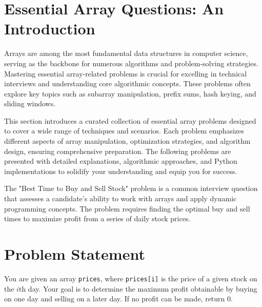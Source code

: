 \section{Essential Array Questions: An Introduction}
\label{sec:EssentialArrayQuestions}

Arrays are among the most fundamental data structures in computer science, serving as the backbone for numerous algorithms and problem-solving strategies. Mastering essential array-related problems is crucial for excelling in technical interviews and understanding core algorithmic concepts. These problems often explore key topics such as subarray manipulation, prefix sums, hash keying, and sliding windows. 

This section introduces a curated collection of essential array problems designed to cover a wide range of techniques and scenarios. Each problem emphasizes different aspects of array manipulation, optimization strategies, and algorithm design, ensuring comprehensive preparation. The following problems are presented with detailed explanations, algorithmic approaches, and Python implementations to solidify your understanding and equip you for success.

\label{problem:Best_Time_to_Buy_and_Sell_Stock}

The "Best Time to Buy and Sell Stock" problem is a common interview question that assesses a candidate's ability to work with arrays and apply dynamic programming concepts. The problem requires finding the optimal buy and sell times to maximize profit from a series of daily stock prices.

\section*{Problem Statement}
You are given an array \texttt{prices}, where \texttt{prices[i]} is the price of a given stock on the \(i\)th day. Your goal is to determine the maximum profit obtainable by buying on one day and selling on a later day. If no profit can be made, return 0.



